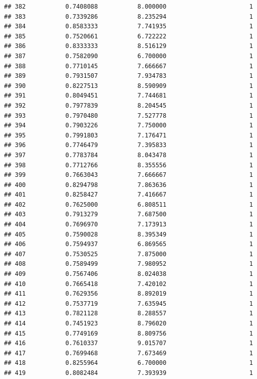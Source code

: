 \documentclass[]{article}
\begin{document}
\begin{verbatim}
## 382           0.7408088           8.000000                       1
## 383           0.7339286           8.235294                       1
## 384           0.8583333           7.741935                       1
## 385           0.7520661           6.722222                       1
## 386           0.8333333           8.516129                       1
## 387           0.7582090           6.700000                       1
## 388           0.7710145           7.666667                       1
## 389           0.7931507           7.934783                       1
## 390           0.8227513           8.590909                       1
## 391           0.8049451           7.744681                       1
## 392           0.7977839           8.204545                       1
## 393           0.7970480           7.527778                       1
## 394           0.7903226           7.750000                       1
## 395           0.7991803           7.176471                       1
## 396           0.7746479           7.395833                       1
## 397           0.7783784           8.043478                       1
## 398           0.7712766           8.355556                       1
## 399           0.7663043           7.666667                       1
## 400           0.8294798           7.863636                       1
## 401           0.8258427           7.416667                       1
## 402           0.7625000           6.808511                       1
## 403           0.7913279           7.687500                       1
## 404           0.7696970           7.173913                       1
## 405           0.7590028           8.395349                       1
## 406           0.7594937           6.869565                       1
## 407           0.7530525           7.875000                       1
## 408           0.7589499           7.980952                       1
## 409           0.7567406           8.024038                       1
## 410           0.7665418           7.420102                       1
## 411           0.7629356           8.892019                       1
## 412           0.7537719           7.635945                       1
## 413           0.7821128           8.288557                       1
## 414           0.7451923           8.796020                       1
## 415           0.7749169           8.809756                       1
## 416           0.7610337           9.015707                       1
## 417           0.7699468           7.673469                       1
## 418           0.8255964           6.700000                       1
## 419           0.8082484           7.393939                       1

\end{verbatim}
\end{document}
